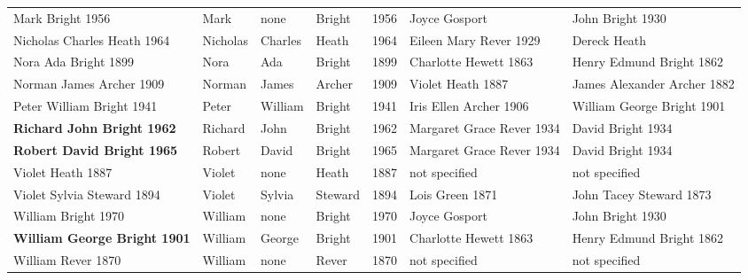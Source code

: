 \begin{landscape}
\begin{longtable}{lp{2cm}p{2cm}lp{2cm}ll}
\rowcolor{lightgray} Mark Bright 1956 & Mark & none & Bright & 1956 & Joyce Gosport & John Bright 1930  \\
\rowcolor{lightgray} Nicholas Charles Heath 1964 & Nicholas & Charles & Heath & 1964 & Eileen Mary Rever 1929  & Dereck Heath \\
Nora Ada Bright 1899 & Nora & Ada & Bright & 1899 & Charlotte Hewett 1863  & Henry Edmund Bright 1862  \\
Norman James Archer 1909 & Norman & James & Archer & 1909 & Violet Heath 1887  & James Alexander Archer 1882  \\
\rowcolor{lightgray} Peter William Bright 1941 & Peter & William & Bright & 1941 & Iris Ellen Archer 1906  & William George Bright 1901  \\
\rowcolor{lightgray} \textbf{Richard John Bright 1962} & Richard & John & Bright & 1962 & Margaret Grace Rever 1934 & David Bright 1934  \\
\rowcolor{lightgray} \textbf{Robert David Bright 1965} & Robert & David & Bright & 1965 & Margaret Grace Rever 1934 & David Bright 1934  \\
Violet Heath 1887 & Violet & none & Heath & 1887 & not specified & not specified \\
\rowcolor{lightgray} Violet Sylvia Steward 1894 & Violet & Sylvia & Steward & 1894 & Lois Green 1871  & John Tacey Steward 1873  \\
\rowcolor{lightgray} William Bright 1970 & William & none & Bright & 1970 & Joyce Gosport & John Bright 1930  \\
\rowcolor{lightgray} \textbf{William George Bright 1901} & William & George & Bright & 1901 & Charlotte Hewett 1863  & Henry Edmund Bright 1862  \\
William Rever 1870 & William & none & Rever & 1870 & not specified & not specified \\
\end{longtable}
\endgroup
\end{landscape}
\normalsize
